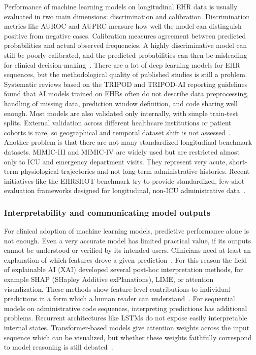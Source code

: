 Performance of machine learning models on longitudinal EHR data is usually evaluated in two main dimensions: discrimination and calibration. Discrimination metrics like AUROC and AUPRC measure how well the model can distinguish positive from negative cases. Calibration measures agreement between predicted probabilities and actual observed frequencies. A highly discriminative model can still be poorly calibrated, and the predicted probabilities can then be misleading for clinical decision-making~\cite{calib_discrim_ecg_2023, carrasco_ribelles_2023_jamia}. There are a lot of deep learning models for EHR sequences, but the methodological quality of published studies is still a problem. Systematic reviews based on the TRIPOD and TRIPOD-AI reporting guidelines found that AI models trained on EHRs often do not describe data preprocessing, handling of missing data, prediction window definition, and code sharing well enough. Most models are also validated only internally, with simple train-test splits. External validation across different healthcare institutions or patient cohorts is rare, so geographical and temporal dataset shift is not assessed~\cite{carrasco_ribelles_2023_jamia, bmj_tripod_ai_2024}. Another problem is that there are not many standardized longitudinal benchmark datasets. MIMIC-III and MIMIC-IV are widely used but are restricted almost only to ICU and emergency department visits. They represent very acute, short-term physiological trajectories and not long-term administrative histories. Recent initiatives like the EHRSHOT benchmark try to provide standardized, few-shot evaluation frameworks designed for longitudinal, non-ICU administrative data~\cite{wori_ehrshot_2023}.

\subsubsection{Interpretability and communicating model outputs}
\label{subsec:interpretability}

For clinical adoption of machine learning models, predictive performance alone is not enough. Even a very accurate model has limited practical value, if its outputs cannot be understood or verified by its intended users. Clinicians need at least an explanation of which features drove a given prediction~\cite{carrasco_ribelles_2023_jamia}. For this reason the field of explainable AI (XAI) developed several post-hoc interpretation methods, for example SHAP (SHapley Additive exPlanations), LIME, or attention visualization. These methods show feature-level contributions to individual predictions in a form which a human reader can understand~\cite{moglia_2025_bmc}. For sequential models on administrative code sequences, interpreting predictions has additional problems. Recurrent architectures like LSTMs do not expose easily interpretable internal states. Transformer-based models give attention weights across the input sequence which can be visualized, but whether these weights faithfully correspond to model reasoning is still debated~\cite{nature_claims_transformer_2022}.

